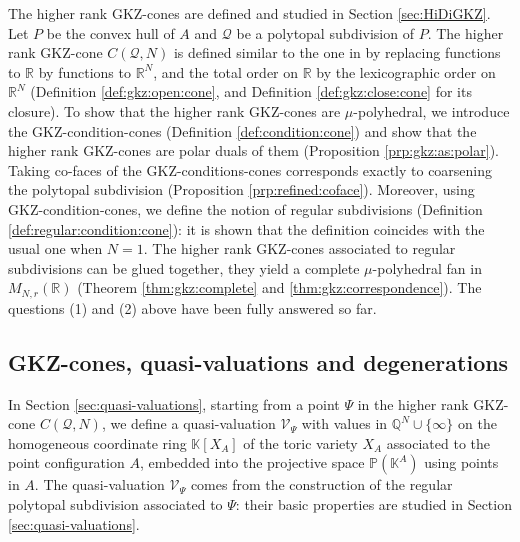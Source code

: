 \documentclass[12pt, a4article]{amsart}   	%
\numberwithin{equation}{section}
\theoremstyle{plain}
\theoremstyle{definition}
\begin{document}
The higher rank GKZ-cones are defined and studied in Section \ref{sec:HiDiGKZ}. Let $P$ be the convex hull of $A$ and $\mathcal{Q}$ be a polytopal subdivision of $P$. The higher rank GKZ-cone $C(\mathcal{Q},N)$ is defined similar to the one in \cite{GKZ} by replacing functions to $\mathbb{R}$ by functions to $\mathbb{R}^N$, and the total order on $\mathbb{R}$ by the lexicographic order on $\mathbb{R}^N$ (Definition \ref{def:gkz:open:cone}, and Definition \ref{def:gkz:close:cone} for its closure). To show that the higher rank GKZ-cones are $\mu$-polyhedral, we introduce the GKZ-condition-cones (Definition \ref{def:condition:cone}) and show that the higher rank GKZ-cones are polar duals of them (Proposition \ref{prp:gkz:as:polar}). Taking co-faces of the GKZ-conditions-cones corresponds exactly to coarsening the polytopal subdivision (Proposition \ref{prp:refined:coface}). Moreover, using GKZ-condition-cones, we define the notion of regular subdivisions (Definition \ref{def:regular:condition:cone}): it is shown that the definition coincides with the usual one when $N=1$. The higher rank GKZ-cones associated to regular subdivisions can be glued together, they yield a complete $\mu$-polyhedral fan in $M_{N,r}(\mathbb{R})$ (Theorem \ref{thm:gkz:complete} and \ref{thm:gkz:correspondence}). The questions (1) and (2) above have been fully answered so far.


\subsection{GKZ-cones, quasi-valuations and degenerations} 
In Section \ref{sec:quasi-valuations}, starting from a point $\Psi$ in the higher rank GKZ-cone $C(\mathcal{Q},N)$, we define a quasi-valuation $\mathcal{V}_\Psi$ with values in $\mathbb{Q}^N\cup\{\infty\}$ on the homogeneous coordinate ring $\mathbb{K}[X_A]$ of the toric variety $X_A$ associated to the point configuration $A$, embedded into the projective space $\mathbb{P}(\mathbb{K}^A)$ using points in $A$. The quasi-valuation $\mathcal{V}_{\Psi}$ comes from the construction of the regular polytopal subdivision associated to $\Psi$: their basic properties are studied in Section \ref{sec:quasi-valuations}.
\end{document}

